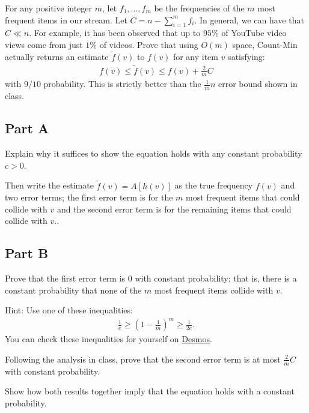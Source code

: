 \documentclass{article}
\begin{document}
For any positive integer \(m\), let \(f_1, \ldots, f_{m}\) be the frequencies of the \(m\) most frequent items in our stream. Let \(C = n - \sum_{i=1}^{m} f_i\). In general, we can have that \(C \ll n\). For example, it has been observed that up to \(95\%\) of YouTube video views come from just \(1\%\) of videos. Prove that using \(O(m)\) space, Count-Min actually returns an estimate \(\tilde{f}(v)\) to \(f(v)\) for any item \(v\) satisfying: \begin{align*}
    f(v) \leq \tilde{f}(v) \leq f(v) + \frac{2}{m} C
\end{align*} with \(9/10\) probability. This is strictly better than the \(\frac{1}{m} n\) error bound shown in class.

\hypertarget{part-a}{%
\subsection*{Part A}\label{part-a}}

Explain why it suffices to show the equation holds with any constant probability \(c > 0\).

Then write the estimate \(\tilde{f}(v) = A[h(v)]\) as the true frequency \(f(v)\) and two error terms; the first error term is for the \(m\) most frequent items that could collide with \(v\) and the second error term is for the remaining items that could collide with \(v\)..

\hypertarget{part-b}{%
\subsection*{Part B}\label{part-b}}

Prove that the first error term is 0 with constant probability; that is, there is a constant probability that none of the \(m\) most frequent items collide with \(v\).

Hint: Use one of these inequalities: \begin{align*}\frac1{e} \geq \left(1-\frac1{m}\right)^m \geq \frac{1}{2e}.\end{align*} You can check these inequalities for yourself on \href{https://www.desmos.com/calculator/bok5upfowo}{Desmos}.

Following the analysis in class, prove that the second error term is at most \(\frac{2}{m}C\) with constant probability.

Show how both results together imply that the equation holds with a constant probability.
\end{document}
